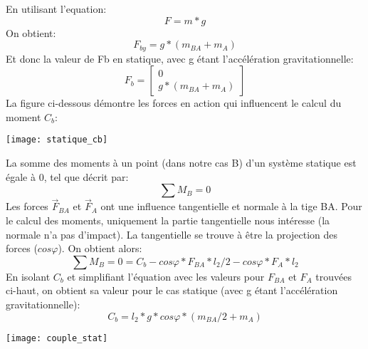 \documentclass{udes_rapport} %
\begin{document}
En utilisant l'equation:
\begin{equation}
	F = m*g
\end{equation}
On obtient:
	\[	F_{by} = g*(m_{BA} + m_A)	\]
Et donc la valeur de Fb en statique, avec g étant l'accélération gravitationnelle:
	\[	F_b = \begin{bmatrix}
	0\\ 
	g*(m_{BA} + m_A)
	\end{bmatrix}	\]
La figure ci-dessous démontre les forces en action qui influencent le calcul du moment $C_b$:
\begin{center}
	\centering
	\texttt{[image: statique\_cb]}
	\label{statique_cb}
\end{center}
La somme des moments à un point (dans notre cas B) d'un système statique est égale à 0, tel que décrit par:
\begin{equation}
	\sum M_B =  0
\end{equation}
Les forces $\overrightarrow F_{BA}$ et $\overrightarrow F_A$ ont une influence tangentielle et normale à la tige BA. Pour le calcul des moments, uniquement la partie tangentielle nous intéresse (la normale n'a pas d'impact). La tangentielle se trouve à être la projection des forces ($cos\varphi$). On obtient alors:
	\[	\sum M_B =  0 = C_b - cos\varphi*F_{BA}*l_2/2 - cos\varphi*F_A*l_2	\]
En isolant $C_b$ et simplifiant l'équation avec les valeurs pour $F_{BA}$ et $F_A$ trouvées ci-haut, on obtient sa valeur pour le cas statique (avec g étant l'accélération gravitationnelle):
	\[	C_b = l_2*g*cos\varphi*(m_{BA}/2+m_A)	\]
\begin{center}
	\centering
	\texttt{[image: couple\_stat]}
	\label{couple_statique}
\end{center}
\end{document}
